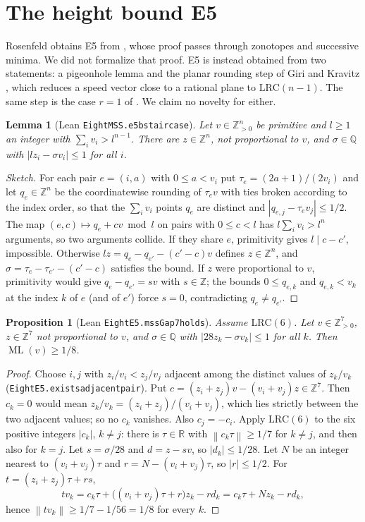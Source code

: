 \documentclass[11pt]{amsart}
\theoremstyle{plain}
\newtheorem{proposition}[theorem]{Proposition}
\newtheorem{lemma}[theorem]{Lemma}
\theoremstyle{definition}
\theoremstyle{remark}
\newcommand{\nrm}[1]{\left\lVert #1 \right\rVert}
\newcommand{\ML}{\operatorname{ML}}
\newcommand{\Z}{\mathbb{Z}}
\newcommand{\Q}{\mathbb{Q}}
\newcommand{\R}{\mathbb{R}}
\newcommand{\lean}[1]{{\def\_{\textunderscore\allowbreak}\def\.{.\allowbreak}\texttt{#1}}}
\newcommand{\LRC}{\mathrm{LRC}}
\begin{document}
\section{The height bound E5}\label{sec:e5}

Rosenfeld obtains E5 from \cite[Theorem~A$'$]{mss}, whose proof passes through zonotopes and
successive minima. We did not formalize that proof. E5 is instead obtained from two statements:
a pigeonhole lemma and the planar rounding step of Giri and Kravitz \cite[Section~7]{gk}, which
reduces a speed vector close to a rational plane to $\LRC(n-1)$. The same step is the case $r=1$
of \cite[Proposition~3.4]{allikvere}. We claim no novelty for either.

\begin{lemma}[Lean \lean{EightMSS.e5b\_staircase}]\label{lem:stair}
Let $v\in\Z_{>0}^n$ be primitive and $l\ge1$ an integer with $\sum_iv_i>l^{n-1}$. There are
$z\in\Z^n$, not proportional to $v$, and $\sigma\in\Q$ with $|lz_i-\sigma v_i|\le1$ for all $i$.
\end{lemma}

\begin{proof}[Sketch]
For each pair $e=(i,a)$ with $0\le a<v_i$ put $\tau_e=(2a+1)/(2v_i)$ and let $q_e\in\Z^n$ be the
coordinatewise rounding of $\tau_ev$ with ties broken according to the index order, so that the
$\sum_iv_i$ points $q_e$ are distinct and $|q_{e,j}-\tau_ev_j|\le1/2$. The map
$(e,c)\mapsto q_e+cv \bmod l$ on pairs with $0\le c<l$ has $l\sum_iv_i>l^n$ arguments, so two
arguments collide. If they share $e$, primitivity gives $l\mid c-c'$, impossible. Otherwise
$lz=q_e-q_{e'}-(c'-c)v$ defines $z\in\Z^n$, and $\sigma=\tau_e-\tau_{e'}-(c'-c)$ satisfies the bound.
If $z$ were proportional to $v$, primitivity would give $q_e-q_{e'}=sv$ with $s\in\Z$; the bounds
$0\le q_{e,k}$ and $q_{e,k}<v_k$ at the index $k$ of $e$ (and of $e'$) force $s=0$, contradicting
$q_e\ne q_{e'}$.
\end{proof}

\begin{proposition}[Lean \lean{EightE5.mssGap7\_holds}]\label{prop:round}
Assume $\LRC(6)$. Let $v\in\Z_{>0}^7$, $z\in\Z^7$ not proportional to $v$, and $\sigma\in\Q$ with
$|28z_k-\sigma v_k|\le1$ for all $k$. Then $\ML(v)\ge1/8$.
\end{proposition}

\begin{proof}
Choose $i,j$ with $z_i/v_i<z_j/v_j$ adjacent among the distinct values of $z_k/v_k$
(\lean{EightE5.exists\_adjacent\_pair}). Put $c=(z_i+z_j)v-(v_i+v_j)z\in\Z^7$. Then $c_k=0$ would
mean $z_k/v_k=(z_i+z_j)/(v_i+v_j)$, which lies strictly between the two adjacent values; so no
$c_k$ vanishes. Also $c_j=-c_i$. Apply $\LRC(6)$ to the six positive integers $|c_k|$, $k\ne j$:
there is $\tau\in\R$ with $\nrm{c_k\tau}\ge1/7$ for $k\ne j$, and then also for $k=j$. Let $s=\sigma/28$
and $d=z-sv$, so $|d_k|\le1/28$. Let $N$ be an integer nearest to $(v_i+v_j)\tau$ and
$r=N-(v_i+v_j)\tau$, so $|r|\le1/2$. For $t=(z_i+z_j)\tau+rs$,
\[
tv_k=c_k\tau+\bigl((v_i+v_j)\tau+r\bigr)z_k-r d_k=c_k\tau+Nz_k-rd_k ,
\]
hence $\nrm{tv_k}\ge1/7-1/56=1/8$ for every $k$.
\end{proof}
\end{document}
